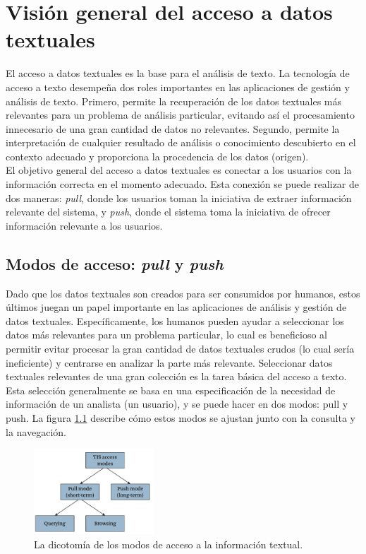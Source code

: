 \chapter{Visión general del acceso a datos textuales}\label{Chapter3}

El acceso a datos textuales es la base para el análisis de texto. La tecnología de acceso a texto desempeña dos roles importantes en las aplicaciones de gestión y análisis de texto. Primero, permite la recuperación de los datos textuales más relevantes para un problema de análisis particular, evitando así el procesamiento innecesario de una gran cantidad de datos no relevantes. Segundo, permite la interpretación de cualquier resultado de análisis o conocimiento descubierto en el contexto adecuado y proporciona la procedencia de los datos (origen). \\

El objetivo general del acceso a datos textuales es conectar a los usuarios con la información correcta en el momento adecuado. Esta conexión se puede realizar de dos maneras: \textit{pull}, donde los usuarios toman la iniciativa de extraer información relevante del sistema, y \textit{push}, donde el sistema toma la iniciativa de ofrecer información relevante a los usuarios.

\section{Modos de acceso: \textit{pull} y \textit{push}}

Dado que los datos textuales son creados para ser consumidos por humanos, estos últimos juegan un papel importante en las aplicaciones de análisis y gestión de datos textuales. Específicamente, los humanos pueden ayudar a seleccionar los datos más relevantes para un problema particular, lo cual es beneficioso al permitir evitar procesar la gran cantidad de datos textuales crudos (lo cual sería ineficiente) y centrarse en analizar la parte más relevante. Seleccionar datos textuales relevantes de una gran colección es la tarea básica del acceso a texto. Esta selección generalmente se basa en una especificación de la necesidad de información de un analista (un usuario), y se puede hacer en dos modos: pull y push. La figura \ref{fig:5.1} describe cómo estos modos se ajustan junto con la consulta y la navegación. \\

\begin{figure}[h]
\centering
\includegraphics[width=0.4\textwidth]{fotos/12.png}
\caption{La dicotomía de los modos de acceso a la información textual.}
\label{fig:5.1}
\end{figure}

